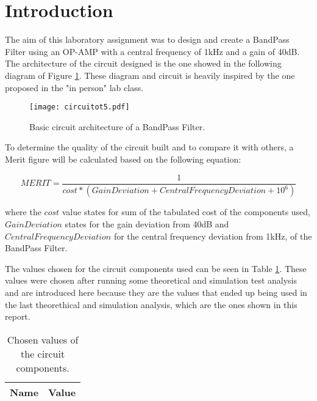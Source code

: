 \newpage
\section{Introduction}
\label{sec:introduction}



The aim of this laboratory assignment was to design and create a BandPass Filter using an OP-AMP with a central frequency of 1kHz and a gain of 40dB.  The architecture of the circuit designed is the one showed in the following diagram of Figure \ref{fig:t5}. These diagram and circuit is heavily inspired by the one proposed in the "in person" lab class. 


\begin{figure}[h] \centering
	\texttt{[image: circuitot5.pdf]}
	\vspace{-2.5cm}
	\caption{Basic circuit architecture of a BandPass Filter.}
	\label{fig:t5}
\end{figure}

To determine the quality of the circuit built and to compare it with others, a Merit figure will be calculated based on the following equation: 

\begin {equation}
	MERIT = \frac{1}{cost*(GainDeviation + CentralFrequencyDeviation + 10^{6})}  	
\label{eq:merit}
\end{equation}

where the $cost$ value states for sum of the tabulated cost of the components used, $GainDeviation$ states for the gain deviation from 40dB and $CentralFrequencyDeviation$ for the central frequency deviation from 1kHz, of the BandPass Filter.

The values chosen for the circuit components used can be seen in Table \ref{tab:values}. These values were chosen after running some theoretical and simulation test analysis and are introduced here because they are the values that ended up being used in the last theorethical and simulation analysis, which are the ones shown in this report.

\begin{table}[H]
	\centering
	\begin{tabular}{|l|r|}
		\hline    
		{\bf Name} & {\bf Value} \\ \hline
		
	\end{tabular}
	\caption{Chosen values of the circuit components.}
	\label{tab:values}
\end{table}

